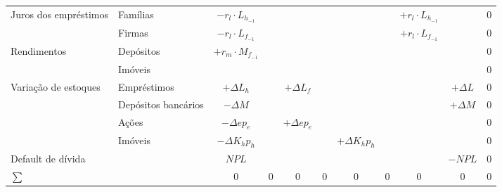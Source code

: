 \begin{landscape}
\begin{longtable}[c]{llccccccccc}
\multirow{2}{*}{Juros dos empréstimos} & Famílias              & $-r_l\cdot L_{h_{-1}}$ &               &                  &         &                   &              & $+r_l\cdot L_{h_{-1}}$ &             & $0$    \\
                                       & Firmas                & $-r_l\cdot L_{f_{-1}}$ &               &                  &         &                   &              & $+r_l\cdot L_{f_{-1}}$ &             & $0$    \\ \hline
\multirow{2}{*}{Rendimentos}           & Depósitos             & $+r_m\cdot M_{f_{-1}}$ &               &                  &         &                   &              &                        &             & $0$    \\
                                       & Imóveis               &                        &               &                  &         &                   &              &                        &             & $0$    \\ \hline
Variação de estoques                   & Empréstimos           & $+\Delta L_h$          &               & $+ \Delta L_f$   &         &                   &              &                        & $+\Delta L$ & $0$    \\
                                       & Depósitos bancários   & $-\Delta M$            &               &                  &         &                   &              &                        & $+\Delta M$ & $0$    \\
                                       & Ações                 & $-\Delta e p_e$        &               & $+\Delta e p_e$  &         &                   &              &                        &             & $0$    \\
                                       & Imóveis               & $-\Delta K_h p_h$      &               &                  &         & $+\Delta K_h p_h$ &              &                        &             & $0$    \\
Default de dívida                      &                       & $NPL$                  &               &                  &         &                   &              &                        & $-NPL$      & $0$    \\
$\sum$                                 &                       & $0$                    & $0$           & $0$              & $0$     & $0$               & $0$          & $0$                    & $0$         & $0$    \\ \hline
\end{longtable}
\end{landscape}